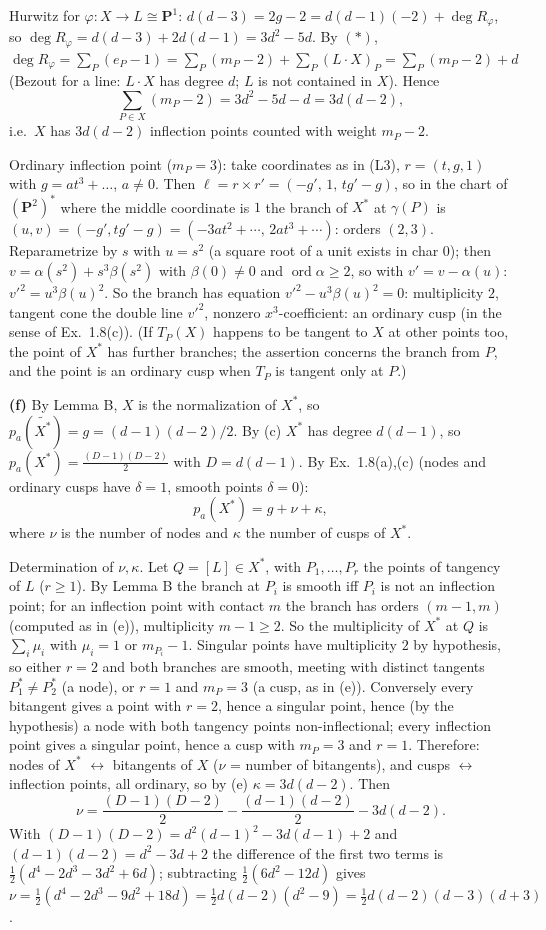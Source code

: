 \documentclass[11pt]{article}
\begin{document}
Hurwitz for $\varphi:X\to L\cong\mathbf P^1$: $d(d-3)=2g-2=d(d-1)(-2)+\deg R_\varphi$, so $\deg R_\varphi=d(d-3)+2d(d-1)=3d^2-5d$. By $(\ast)$, $\deg R_\varphi=\sum_P(e_P-1)=\sum_P(m_P-2)+\sum_P(L\cdot X)_P=\sum_P(m_P-2)+d$ (Bezout for a line: $L\cdot X$ has degree $d$; $L$ is not contained in $X$). Hence
\[
\sum_{P\in X}(m_P-2)=3d^2-5d-d=3d(d-2),
\]
i.e.\ $X$ has $3d(d-2)$ inflection points counted with weight $m_P-2$.

Ordinary inflection point ($m_P=3$): take coordinates as in (L3), $r=(t,g,1)$ with $g=at^3+\dots$, $a\ne0$. Then $\ell=r\times r'=(-g',\,1,\,tg'-g)$, so in the chart of $(\mathbf P^2)^*$ where the middle coordinate is $1$ the branch of $X^*$ at $\gamma(P)$ is $(u,v)=(-g',tg'-g)=(-3at^2+\cdots,\,2at^3+\cdots)$: orders $(2,3)$. Reparametrize by $s$ with $u=s^2$ (a square root of a unit exists in char $0$); then $v=\alpha(s^2)+s^3\beta(s^2)$ with $\beta(0)\ne0$ and $\operatorname{ord}\alpha\ge2$, so with $v'=v-\alpha(u)$: $v'^2=u^3\beta(u)^2$. So the branch has equation $v'^2-u^3\beta(u)^2=0$: multiplicity $2$, tangent cone the double line $v'^2$, nonzero $x^3$-coefficient: an ordinary cusp (in the sense of Ex.~1.8(c)). (If $T_P(X)$ happens to be tangent to $X$ at other points too, the point of $X^*$ has further branches; the assertion concerns the branch from $P$, and the point is an ordinary cusp when $T_P$ is tangent only at $P$.)

\textbf{(f)} By Lemma B, $X$ is the normalization of $X^*$, so $p_a(\widetilde{X^*})=g=(d-1)(d-2)/2$. By (c) $X^*$ has degree $d(d-1)$, so $p_a(X^*)=\frac{(D-1)(D-2)}2$ with $D=d(d-1)$. By Ex.~1.8(a),(c) (nodes and ordinary cusps have $\delta=1$, smooth points $\delta=0$):
\[
p_a(X^*)=g+\nu+\kappa,
\]
where $\nu$ is the number of nodes and $\kappa$ the number of cusps of $X^*$.

Determination of $\nu,\kappa$. Let $Q=[L]\in X^*$, with $P_1,\dots,P_r$ the points of tangency of $L$ ($r\ge1$). By Lemma B the branch at $P_i$ is smooth iff $P_i$ is not an inflection point; for an inflection point with contact $m$ the branch has orders $(m-1,m)$ (computed as in (e)), multiplicity $m-1\ge2$. So the multiplicity of $X^*$ at $Q$ is $\sum_i\mu_i$ with $\mu_i=1$ or $m_{P_i}-1$. Singular points have multiplicity $2$ by hypothesis, so either $r=2$ and both branches are smooth, meeting with distinct tangents $P_1^*\ne P_2^*$ (a node), or $r=1$ and $m_P=3$ (a cusp, as in (e)). Conversely every bitangent gives a point with $r=2$, hence a singular point, hence (by the hypothesis) a node with both tangency points non-inflectional; every inflection point gives a singular point, hence a cusp with $m_P=3$ and $r=1$. Therefore: nodes of $X^*$ $\leftrightarrow$ bitangents of $X$ ($\nu$ = number of bitangents), and cusps $\leftrightarrow$ inflection points, all ordinary, so by (e) $\kappa=3d(d-2)$. Then
\[
\nu=\frac{(D-1)(D-2)}2-\frac{(d-1)(d-2)}2-3d(d-2).
\]
With $(D-1)(D-2)=d^2(d-1)^2-3d(d-1)+2$ and $(d-1)(d-2)=d^2-3d+2$ the difference of the first two terms is $\frac12(d^4-2d^3-3d^2+6d)$; subtracting $\frac12(6d^2-12d)$ gives $\nu=\frac12(d^4-2d^3-9d^2+18d)=\frac12d(d-2)(d^2-9)=\tfrac12d(d-2)(d-3)(d+3)$.
\end{document}
